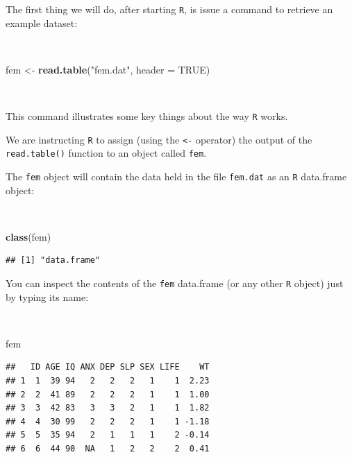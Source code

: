 \documentclass[12pt,a4paper]{book}
\newenvironment{Shaded}{\begin{snugshade}}{\end{snugshade}}
\newcommand{\DataTypeTok}[1]{\textcolor[rgb]{0.13,0.29,0.53}{#1}}
\newcommand{\KeywordTok}[1]{\textcolor[rgb]{0.13,0.29,0.53}{\textbf{#1}}}
\newcommand{\NormalTok}[1]{#1}
\newcommand{\OtherTok}[1]{\textcolor[rgb]{0.56,0.35,0.01}{#1}}
\newcommand{\StringTok}[1]{\textcolor[rgb]{0.31,0.60,0.02}{#1}}
\theoremstyle{definition}
\theoremstyle{definition}
\theoremstyle{definition}
\theoremstyle{remark}
\begin{document}
The first thing we will do, after starting \texttt{R}, is issue a
command to retrieve an example dataset:

~

\begin{Shaded}
\begin{Highlighting}[]
\NormalTok{fem <-}\StringTok{ }\KeywordTok{read.table}\NormalTok{(}\StringTok{"fem.dat"}\NormalTok{, }\DataTypeTok{header =} \OtherTok{TRUE}\NormalTok{)}
\end{Highlighting}
\end{Shaded}

~

This command illustrates some key things about the way \texttt{R} works.

We are instructing \texttt{R} to assign (using the \texttt{\textless{}-}
operator) the output of the \texttt{read.table()} function to an object
called \texttt{fem}.

The \texttt{fem} object will contain the data held in the file
\texttt{fem.dat} as an \texttt{R} data.frame object:

~

\begin{Shaded}
\begin{Highlighting}[]
\KeywordTok{class}\NormalTok{(fem)}
\end{Highlighting}
\end{Shaded}

\begin{verbatim}
## [1] "data.frame"
\end{verbatim}

\newpage

You can inspect the contents of the \texttt{fem} data.frame (or any
other \texttt{R} object) just by typing its name:

~

\begin{Shaded}
\begin{Highlighting}[]
\NormalTok{fem}
\end{Highlighting}
\end{Shaded}

\begin{verbatim}
##   ID AGE IQ ANX DEP SLP SEX LIFE    WT
## 1  1  39 94   2   2   2   1    1  2.23
## 2  2  41 89   2   2   2   1    1  1.00
## 3  3  42 83   3   3   2   1    1  1.82
## 4  4  30 99   2   2   2   1    1 -1.18
## 5  5  35 94   2   1   1   1    2 -0.14
## 6  6  44 90  NA   1   2   2    2  0.41
\end{verbatim}
\end{document}
